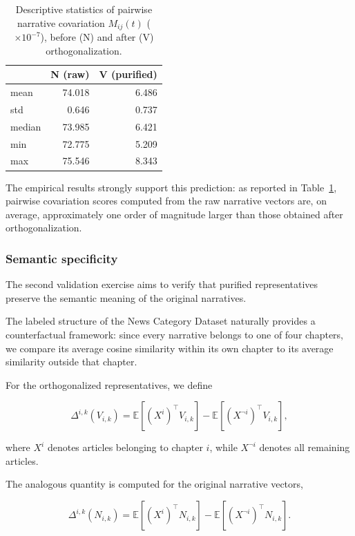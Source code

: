 \documentclass[
  journal=medium,
  manuscript=article-type,
  year=2025,
  volume=1,
]{cup-journal}
\begin{document}
\begin{table}[ht]
\centering
\begin{tabular}{lrr}
\toprule
 & N (raw) & V (purified) \\
\midrule
mean & 74.018 & 6.486 \\
std & 0.646 & 0.737 \\
median & 73.985 & 6.421 \\
min & 72.775 & 5.209 \\
max & 75.546 & 8.343 \\
\bottomrule
\end{tabular}
\caption{Descriptive statistics of pairwise narrative covariation $M_{ij}(t)$ ($\times 10^{-7}$), before (N) and after (V) orthogonalization.}
\label{tab:covariation_stats}
\end{table}

The empirical results strongly support this prediction: as reported in Table~\ref{tab:covariation_stats}, pairwise covariation scores computed from the raw narrative vectors are, on average, approximately one order of magnitude larger than those obtained after orthogonalization.

\subsubsection{Semantic specificity}

The second validation exercise aims to verify that purified representatives preserve the semantic meaning of the original narratives.

The labeled structure of the News Category Dataset naturally provides a counterfactual framework: since every narrative belongs to one of four chapters, we compare its average cosine similarity within its own chapter to its average similarity outside that chapter.

For the orthogonalized representatives, we define

\[
\Delta^{i,k}(V_{i,k})
=
\mathbb{E}
\!\left[
(X^{i})^\top V_{i,k}
\right]
-
\mathbb{E}
\!\left[
(X^{\neg i})^\top V_{i,k}
\right],
\]

where $X^{i}$ denotes articles belonging to chapter $i$, while $X^{\neg i}$ denotes all remaining articles.

The analogous quantity is computed for the original narrative vectors,

\[
\Delta^{i,k}(N_{i,k})
=
\mathbb{E}
\!\left[
(X^{i})^\top N_{i,k}
\right]
-
\mathbb{E}
\!\left[
(X^{\neg i})^\top N_{i,k}
\right].
\]
\end{document}
